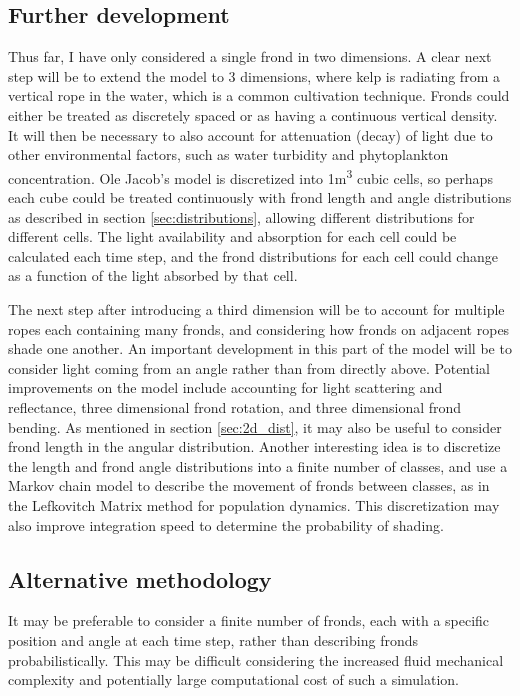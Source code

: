 \documentclass[10pt]{article}
\begin{document}
\begin{multicols}{2}
\subsection{Further development}
Thus far, I have only considered a single frond in two dimensions.
A clear next step will be to extend the model to 3 dimensions, where kelp is radiating from a vertical rope in the water, which is a common cultivation technique.
Fronds could either be treated as discretely spaced or as having a continuous vertical density.
It will then be necessary to also account for attenuation (decay) of light due to other environmental factors, such as water turbidity and phytoplankton concentration.
Ole Jacob's model is discretized into 1m\textsuperscript{3} cubic cells, so perhaps each cube could be treated continuously with frond length and angle distributions as described in section \ref{sec:distributions}, allowing different distributions for different cells.
The light availability and absorption for each cell could be calculated each time step, and the frond distributions for each cell could change as a function of the light absorbed by that cell.

The next step after introducing a third dimension will be to account for multiple ropes each containing many fronds, and considering how fronds on adjacent ropes shade one another.
An important development in this part of the model will be to consider light coming from an angle rather than from directly above.
Potential improvements on the model include accounting for light scattering and reflectance, three dimensional frond rotation, and three dimensional frond bending.
As mentioned in section \ref{sec:2d_dist}, it may also be useful to consider frond length in the angular distribution.
Another interesting idea is to discretize the length and frond angle distributions into a finite number of classes, and use a Markov chain model to describe the movement of fronds between classes, as in the Lefkovitch Matrix method for population dynamics.
This discretization may also improve integration speed to determine the probability of shading.

\subsection{Alternative methodology}
It may be preferable to consider a finite number of fronds, each with a specific position and angle at each time step, rather than describing fronds probabilistically. This may be difficult considering the increased fluid mechanical complexity and potentially large computational cost of such a simulation.


\end{multicols}
\end{document}
